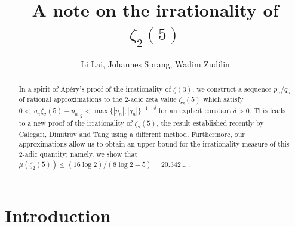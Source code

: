 \documentclass[12pt]{article}
\makeatletter
\newcommand{\subjclass}[2][2020]{%
  \let\@oldtitle\@title%
  \gdef\@title{\@oldtitle\footnotetext{#1 \emph{Mathematics subject classification.} #2}}%
}
\newcommand{\keywords}[1]{%
  \let\@@oldtitle\@title%
  \gdef\@title{\@@oldtitle\footnotetext{\emph{Key words and phrases.} #1}}%
}
\let\le\leqslant
\theoremstyle{remark}
\numberwithin{equation}{section}
\makeatother
\begin{document}
\title{A note on the irrationality of $\zeta_2(5)$}

\author{Li Lai, Johannes Sprang, Wadim Zudilin}
\date{}
\subjclass[2020]{11J72 (primary), 11J82, 11M06, 33C20 (secondary).}
\keywords{Irrationality, irrationality measure, zeta value, hypergeometric series.}

\maketitle

\begin{abstract}
In a spirit of Ap\'ery's proof of the irrationality of $\zeta(3)$,
we construct a sequence $p_n/q_n$ of rational approximations to the $2$-adic zeta value $\zeta_2(5)$ which satisfy $0 <|q_n\zeta_2(5)-p_n|_2 < \max\{ |p_n|,|q_n| \}^{-1-\delta}$ for an explicit constant $\delta>0$.
This leads to a new proof of the irrationality of $\zeta_2(5)$, the result established recently by Calegari, Dimitrov and Tang using a different method.
Furthermore, our approximations allow us to obtain an upper bound for the irrationality measure of this $2$-adic quantity; namely, we show that $\mu(\zeta_2(5)) \le (16\log 2)/(8 \log 2 -5) = 20.342\dots$\,.
\end{abstract}

\section{Introduction}
\end{document}
